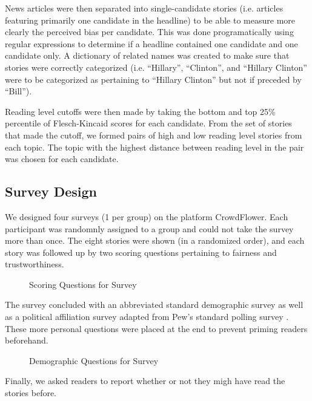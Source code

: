 News articles were then separated into single-candidate stories (i.e. articles featuring primarily one candidate in the headline) to be able to measure more clearly the perceived bias per candidate. This was done programatically using regular expressions to determine if a headline contained one candidate and one candidate only. A dictionary of related names was created to make sure that stories were correctly categorized (i.e. ``Hillary'', ``Clinton'', and ``Hillary Clinton'' were to be categorized as pertaining to ``Hillary Clinton'' but not if preceded by ``Bill'').

Reading level cutoffs were then made by taking the bottom and top 25\% percentile of Flesch-Kincaid scores for each candidate. From the set of stories that made the cutoff, we formed pairs of high and low reading level stories from each topic. The topic with the highest distance between reading level in the pair was chosen for each candidate.

 
\subsection{Survey Design}
We designed four surveys (1 per group) on the platform CrowdFlower. Each participant was randomnly assigned to a group and could not take the survey more than once. The eight stories were shown (in a randomized order), and each story was followed up by two scoring questions pertaining to fairness and trustworthiness.

\begin{figure}[H] 
\centering
  \caption{Scoring Questions for Survey}
\end{figure}

The survey concluded with an abbreviated standard demographic survey as well as a political affiliation survey adapted from Pew's standard polling survey \cite{Pew-demographics}. These more personal questions were placed at the end to prevent priming readers beforehand.


\begin{figure}[h!] 
\centering
  \caption{Demographic Questions for Survey}
\end{figure}

Finally, we asked readers to report whether or not they migh have read the stories before.

